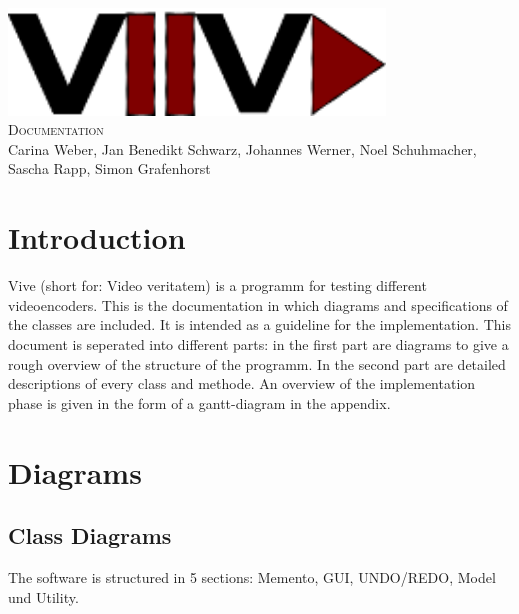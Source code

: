 \documentclass[twoside]{book}
\newcommand{\+}{\discretionary{\mbox{\scriptsize$\hookleftarrow$}}{}{}}
\newcommand{\clearemptydoublepage}{%
  \newpage{\pagestyle{empty}\cleardoublepage}%
}
\begin{document}
\hypersetup{pageanchor=false,
             bookmarks=true,
             bookmarksnumbered=true,
             pdfencoding=unicode
            }
\begin{titlepage}
\vspace*{7cm}
\begin{center}%
{\centering\includegraphics[width=10cm]{Logo.png}}\\
\vspace*{2cm}
\fontsize{40}{48} \selectfont \textsc{Documentation}\\
\vspace*{1cm}
\vspace*{0.5cm}
{\small Carina Weber, Jan Benedikt Schwarz, Johannes Werner, Noel Schuhmacher, Sascha Rapp, Simon Grafenhorst}\\
\end{center}
\end{titlepage}
\clearemptydoublepage
\tableofcontents
{}
\hypersetup{pageanchor=true}

\chapter{Introduction}
Vive (short for: Video veritatem) is a programm for testing different videoencoders. This is the documentation in which diagrams and specifications of the classes are included. It is intended as a guideline for the implementation.
This document is seperated into different parts: in the first part are diagrams to give a rough overview of the structure of the programm. In the second part are detailed descriptions of every class and methode. An overview of the implementation phase is given in the form of a gantt-diagram in the appendix.
\chapter{Diagrams}
\section{Class Diagrams}
The software is structured in 5 sections: Memento, GUI, UNDO/REDO, Model und Utility.    
\end{document}
